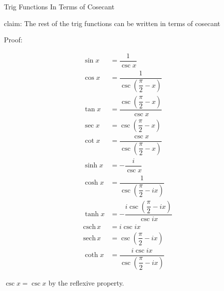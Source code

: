 \documentclass[12pt]{article}
\begin{document}
\pagebreak\begin{section}{Trig Functions In Terms of Cosecant}
	
	\noindent claim: The rest of the trig functions can be written in terms of cosecant

	\noindent Proof:

	\begin{align} %
		\sin x & =\dfrac1{\csc x}\\
		\cos x & =\dfrac1{\csc\left(\dfrac\pi2-x\right)}\\
		\tan x & =\dfrac{\csc\left(\dfrac\pi2-x\right)}{\csc x}\\
		\sec x & =\csc\left(\dfrac\pi2-x\right)\\
		\cot x & =\dfrac{\csc x}{\csc\left(\dfrac\pi2-x\right)}\\
		\sinh x & =-\dfrac i{\csc x}\\
		\cosh x & =\dfrac1{\csc\left(\dfrac\pi2-ix\right)}\\
		\tanh x & =-\dfrac{i\csc\left(\dfrac\pi2-ix\right)}{\csc ix}\\
		\text{csch}\,x & =i\csc ix\\
		\text{sech}\,x & =\csc\left(\dfrac\pi2-ix\right)\\
		\coth x & =\dfrac{i\csc ix}{\csc\left(\dfrac\pi2-ix\right)}
	\end{align}

	\centerline{$\csc x=\csc x$ by the reflexive property.}

	\noindent\blacksquare
\end{section}
\end{document}
